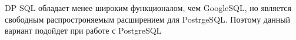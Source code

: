 DP SQL обладает менее широким функционалом, чем GoogleSQL, но является свободным распростроняемым расширением для PostrgeSQL.
Поэтому данный вариант подойдет при работе с PostgreSQL



